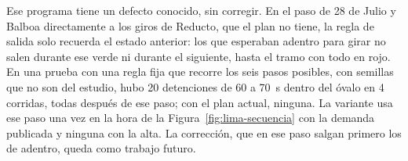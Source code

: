 Ese programa tiene un defecto conocido, sin corregir. En el paso de 28
de Julio y Balboa directamente a los giros de Reducto, que el plan no
tiene, la regla de salida solo recuerda el estado anterior: los que
esperaban adentro para girar no salen durante ese verde ni durante el
siguiente, hasta el tramo con todo en rojo. En una prueba con una regla
fija que recorre los seis pasos posibles, con semillas que no son del
estudio, hubo 20 detenciones de 60 a 70~s dentro del óvalo en 4
corridas, todas después de ese paso; con el plan actual, ninguna. La
variante usa ese paso una vez en la hora de la
Figura~\ref{fig:lima-secuencia} con la demanda publicada y ninguna con
la alta. La corrección, que en ese paso salgan primero los de adentro,
queda como trabajo futuro.

